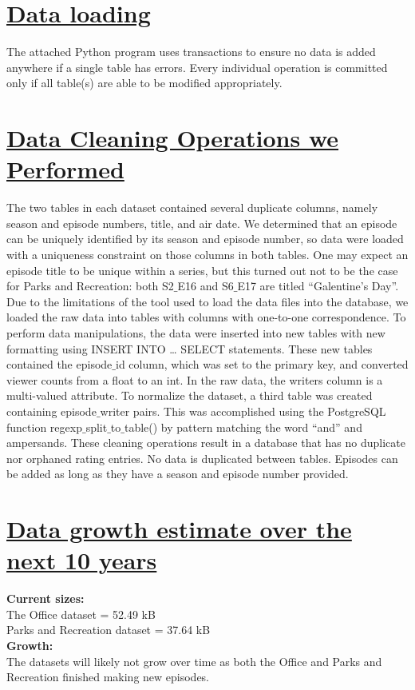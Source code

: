 \documentclass{article}
\begin{document}
\section*{\underline{Data loading}}
The attached Python program uses transactions to ensure no data is added anywhere if a single table has errors. Every individual operation is committed only if all table(s) are able to be modified appropriately. 

\section*{\underline{Data Cleaning Operations we Performed}}
The two tables in each dataset contained several duplicate columns, namely season and episode numbers, title, and air date. We determined that an episode can be uniquely identified by its season and episode number, so data were loaded with a uniqueness constraint on those columns in both tables. One may expect an episode title to be unique within a series, but this turned out not to be the case for Parks and Recreation: both S2$\_$E16 and S6$\_$E17 are titled “Galentine’s Day”. 
Due to the limitations of the tool used to load the data files into the database, we loaded the raw data into tables with columns with one-to-one correspondence. To perform data manipulations, the data were inserted into new tables with new formatting using INSERT INTO … SELECT statements. These new tables contained the episode$\_$id column, which was set to the primary key, and converted viewer counts from a float to an int. 
In the raw data, the writers column is a multi-valued attribute. To normalize the dataset, a third table was created containing episode$\_$writer pairs. This was accomplished using the PostgreSQL function regexp$\_$split$\_$to$\_$table() by pattern matching the word “and” and ampersands. 
These cleaning operations result in a database that has no duplicate nor orphaned rating entries. No data is duplicated between tables. Episodes can be added as long as they have a season and episode number provided. 

\section*{\underline{Data growth estimate over the next 10 years}}
\textbf{Current sizes:} \\
\hspace*{1cm} The Office dataset = 52.49 kB\\
\hspace*{1cm} Parks and Recreation dataset = 37.64 kB\\
\textbf{Growth:}\\
\hspace*{1cm} The datasets will likely not grow over time as both the Office and Parks and Recreation finished 
\hspace*{1cm} making new episodes.
\end{document}
